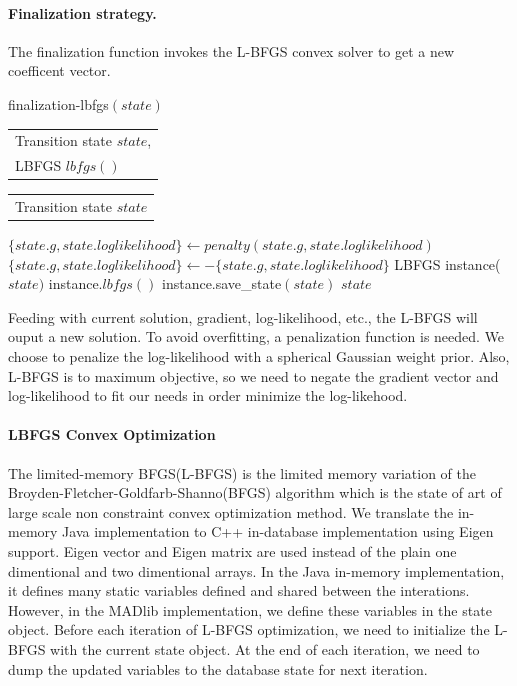 \documentclass[11pt,letterpaper]{article}
\newlength{\alglabelwidth}
\newcommand{\alginput}[1]{%
\par\noindent%
\settowidth{\alglabelwidth}{\emph{Output:}}%
\makebox[\alglabelwidth][l]{\emph{Input:}} \begin{tabular}[t]{l} #1 \end{tabular}}
\newcommand{\algoutput}[1]{%
\par\noindent%
\settowidth{\alglabelwidth}{\emph{Output:}}%
\makebox[\alglabelwidth][l]{\emph{Output:}} \begin{tabular}[t]{l} #1 \end{tabular}}
\begin{document}
\paragraph{Finalization strategy.}
The finalization function invokes the L-BFGS convex solver to get a new coefficent vector.\\

\begin{algorithm}
\caption{finalization-lbfgs$(state)$} \label{alg:CRF training}
\alginput{Transition state $state$,\\
LBFGS $\mathit{lbfgs}()$}
\algoutput{Transition state $state$}
\begin{algorithmic}[1]
        \State $\{state.g,state.loglikelihood\} \gets penalty(state.g,state.loglikelihood)$ 
        \State $\{state.g,state.loglikelihood\}\gets-\{state.g,state.loglikelihood\}$ 
        \State LBFGS instance($state)$ 
        \State instance.$lbfgs()$ 
        \State instance.save\_state$(state)$ 
        \State \Return $state$
\end{algorithmic}
\end{algorithm}

Feeding with current solution, gradient, log-likelihood, etc., the L-BFGS will ouput a new solution.
To avoid overfitting, a penalization function is needed. We choose to penalize the log-likelihood with a spherical Gaussian weight prior.
Also, L-BFGS is to maximum objective, so we need to negate the gradient vector and log-likelihood to fit our needs in order minimize the log-likehood.

\paragraph{LBFGS Convex Optimization}
The limited-memory BFGS(L-BFGS) is the limited memory variation of the Broyden-Fletcher-Goldfarb-Shanno(BFGS) algorithm which
is the state of art of large scale non constraint convex optimization method.
We translate the in-memory Java implementation to C++ in-database implementation using Eigen support.
Eigen vector and Eigen matrix are used instead of the plain one dimentional and two dimentional arrays.
In the Java in-memory implementation, it defines many static variables defined and shared between the interations.
However, in the MADlib implementation, we define these variables in the state object.
Before each iteration of L-BFGS optimization, we need to initialize the L-BFGS with the current state object. 
At the end of each iteration, we need to dump the updated variables to the database state for next iteration.
\end{document}
